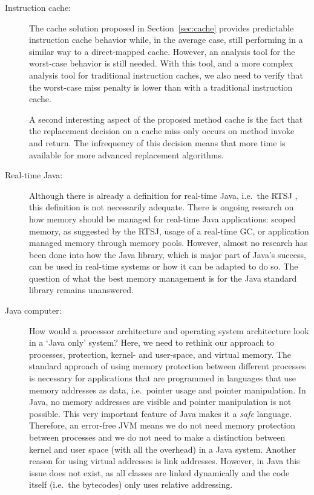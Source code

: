 \begin{description}
    \item[Instruction cache:]
The cache solution proposed in Section~\ref{sec:cache} provides
predictable instruction cache behavior while, in the average case,
still performing in a similar way to a direct-mapped cache. However,
an analysis tool for the worst-case behavior is still needed. With
this tool, and a more complex analysis tool for traditional
instruction caches, we also need to verify that the worst-case miss
penalty is lower than with a traditional instruction cache.

A second interesting aspect of the proposed method cache is the fact
that the replacement decision on a cache miss only occurs on method
invoke and return. The infrequency of this decision means that more
time is available for more advanced replacement algorithms.


    \item[Real-time Java:] Although there is already a definition
        for real-time Java, i.e.\ the RTSJ \cite{rtsj}, this
        definition is not necessarily adequate. There is ongoing
        research on how memory should be managed for real-time
        Java applications: scoped memory, as suggested by the
        RTSJ, usage of a real-time GC, or application managed
        memory through memory pools. However, almost no research
        has been done into how the Java library, which is major
        part of Java's success, can be used in real-time systems
        or how it can be adapted to do so. The question of what
        the best memory management is for the Java standard
        library remains unanswered.

    \item[Java computer:] How would a processor architecture and
        operating system architecture look in a `Java only'
        system? Here, we need to rethink our approach to
        processes, protection, kernel- and user-space, and
        virtual memory. The standard approach of using memory
        protection between different processes is necessary for
        applications that are programmed in languages that use
        memory addresses as data, i.e.\ pointer usage and pointer
        manipulation. In Java, no memory addresses are visible
        and pointer manipulation is not possible. This very
        important feature of Java makes it a \emph{safe}
        language. Therefore, an error-free JVM means we do not
        need memory protection between processes and we do not
        need to make a distinction between kernel and user space
        (with all the overhead) in a Java system. Another reason
        for using virtual addresses is link addresses. However,
        in Java this issue does not exist, as all classes are
        linked dynamically and the code itself (i.e.\ the
        bytecodes) only uses relative addressing.


\end{description}
